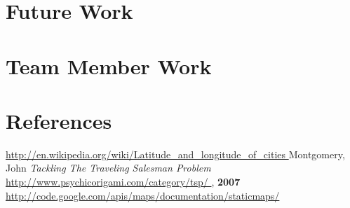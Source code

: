 \documentclass[12pt]{article}
\begin{document}
\section{Future Work}
\section{Team Member Work}
\section{References}
\begin{thebibliography}{99}
 {\href{ http://en.wikipedia.org/wiki/Latitude_and_longitude_of_cities }{ http://en.wikipedia.org/wiki/Latitude\_and\_longitude\_of\_cities }}
 Montgomery, John {\it Tackling The Traveling Salesman Problem }{\href{ http://www.psychicorigami.com/category/tsp/ }{ http://www.psychicorigami.com/category/tsp/ } }, {\bf 2007}
 {\href{ http://code.google.com/apis/maps/documentation/staticmaps/  }{ http://code.google.com/apis/maps/documentation/staticmaps/ }}
\end{thebibliography}
\end{document}
